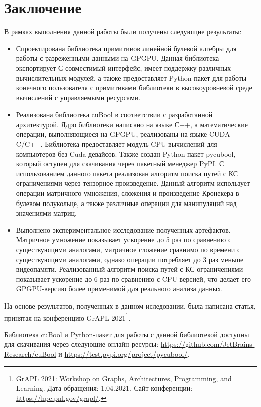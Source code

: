 \section{Заключение}

В рамках выполнения данной работы были получены следующие результаты:

\begin{itemize}
    \item Спроектирована библиотека примитивов линейной булевой алгебры для работы с разреженными данными на GPGPU. 
    Данная библиотека экспортирует С-совместимый интерфейс, имеет поддержку различных вычислительных модулей, а также предоставляет Python-пакет для работы конечного пользователя с примитивами библиотеки в высокоуровневой среде вычислений с управляемыми ресурсами.

    \item Реализована библиотека cuBool в соответствии с разработанной архитектурой. 
    Ядро библиотеки написано на языке С++, а математические операции, выполняющиеся на GPGPU, реализованы на языке CUDA C/C++. Библиотека предоставляет модуль CPU вычислений для компьютеров без Cuda девайсов. 
    Также создан Python-пакет pycubool, который оступен для скачивания через пакетный менеджер PyPI.
    С использованием данного пакета реализован алгоритм поиска путей с КС ограничениями через тензорное произведение. 
    Данный алгоритм использует операции матричного умножения, сложения и произведение Кронекера в булевом полукольце, а также различные операции для манипуляций над значениями матриц. 
    
    \item Выполнено экспериментальное исследование полученных артефактов.
    Матричное умножение показывает ускорение до 5 раз по сравнению с существующими аналогами, 
    матричное сложение сравнимо по времени с существующими аналогами, 
    однако операции потребляет до 3 раз меньше видеопамяти. 
    Реализованный алгоритм поиска путей с КС ограничениями показывает ускорение до 6 раз по сравнению с CPU версией, 
    что делает его GPGPU-версию более применимой для реального анализа данных.
\end{itemize}

На основе результатов, полученных в данном иследовании, была написана статья, принятая на конференцию GrAPL 2021\footnote{GrAPL 2021: Workshop on Graphs, Architectures, Programming, and Learning. Дата обращения: 1.04.2021. Сайт конференции: \url{https://hpc.pnl.gov/grapl/}.}.

Библиотека cuBool и Python-пакет для работы с данной библиотекой доступны для скачивания через следующие онлайн ресурсы: \url{https://github.com/JetBrains-Research/cuBool} и \url{https://test.pypi.org/project/pycubool/}.